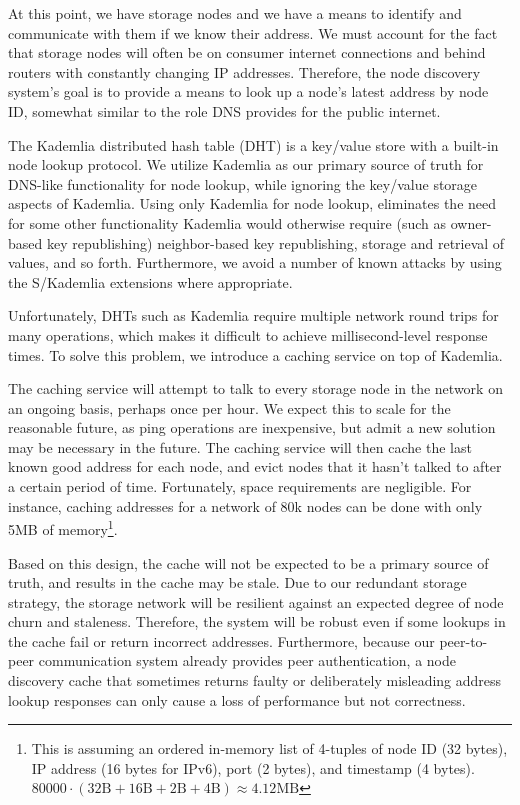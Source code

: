 \documentclass[11pt,fleqn,openany]{book}
\begin{document}
At this point, we have storage nodes and we have a means to identify and
communicate with
them if we know their address. We must account for the fact that storage nodes
will often be on consumer internet connections and behind routers with
constantly changing IP
addresses. Therefore, the node discovery system's goal is to provide a means to look
up a node's latest address by node ID, somewhat similar to the role DNS
provides for the public internet.

The Kademlia distributed hash table (DHT) is a key/value store with a built-in node lookup protocol.
We utilize Kademlia as our primary source of truth for DNS-like
functionality for node lookup, while ignoring the key/value storage aspects of
Kademlia.
Using only Kademlia for node lookup, eliminates the need for some other
functionality Kademlia would otherwise require (such as owner-based key
republishing) neighbor-based key republishing, storage and retrieval of values,
and so forth. Furthermore, we avoid a number of known attacks by using the
S/Kademlia \cite{skad} extensions where appropriate.

Unfortunately, DHTs such as Kademlia require multiple network round trips for
many operations, which makes it difficult to achieve millisecond-level
response times. To solve this problem, we introduce a caching service on top
of Kademlia.

The caching service will attempt to talk to every storage node in the network
on an ongoing basis, perhaps once per hour. We expect this to scale for the
reasonable future, as ping operations are inexpensive, but admit a new solution
may be necessary in the future.
The caching service will then cache
the last known good address for each node, and evict nodes that it hasn't talked
to after a certain period of time.
Fortunately, space requirements are negligible. For instance, caching addresses
for a network of 80k nodes
can be done with only 5MB of memory\footnote{
This is assuming an ordered in-memory list of 4-tuples of node ID (32 bytes),
IP address (16 bytes for IPv6), port (2 bytes), and timestamp (4 bytes).
$80000\cdot(32 \mbox{B}+16 \mbox{B}+2 \mbox{B}+4 \mbox{B}) \approx 4.12 \mbox{MB}$
}.

Based on this design, the cache will not be expected to be a primary source
of truth, and results in the cache may be stale. Due to our redundant
storage strategy, the storage network will be resilient against an expected
degree of node churn and staleness.
Therefore, the system will be robust even if some lookups in the cache
fail or return incorrect addresses.
Furthermore, because our peer-to-peer communication
system already provides peer authentication, a node discovery cache that
sometimes returns faulty
or deliberately misleading address lookup responses can only cause a
loss of performance but not correctness.
\end{document}
